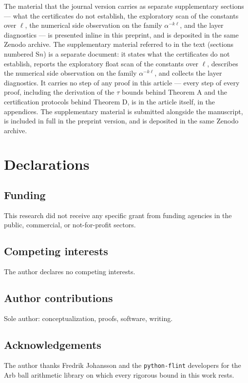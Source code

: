 \ifx\JOURNALVERSION\undefined
The material that the journal version carries as separate supplementary
sections --- what the certificates do not establish, the exploratory scan of
the constants over $\ell$, the numerical side observation on the family
$\alpha^{-k\ell}$, and the layer diagnostics --- is presented inline in this
preprint, and is deposited in the same Zenodo archive.
\else
The supplementary material referred to in the text (sections numbered
$\mathrm{S}n$) is a separate document: it states what the certificates do not
establish, reports the exploratory float scan of the constants over $\ell$,
describes the numerical side observation on the family $\alpha^{-k\ell}$, and
collects the layer diagnostics. It
carries no step of any proof in this article --- every step of every proof,
including the derivation of the $\tau$ bounds behind Theorem A and the
certification protocols behind Theorem D, is in the article itself, in the
appendices. The supplementary material is submitted alongside the manuscript,
is included in full in the preprint version, and is deposited in the same
Zenodo archive.
\fi

\section*{Declarations}

\subsection*{Funding}
This research did not receive any specific grant from funding agencies in the
public, commercial, or not-for-profit sectors.

\subsection*{Competing interests}
The author declares no competing interests.

\subsection*{Author contributions}
Sole author: conceptualization, proofs, software, writing.

\subsection*{Acknowledgements}
The author thanks Fredrik Johansson and the \texttt{python-flint} developers for
the Arb ball arithmetic library on which every rigorous bound in this work
rests.
